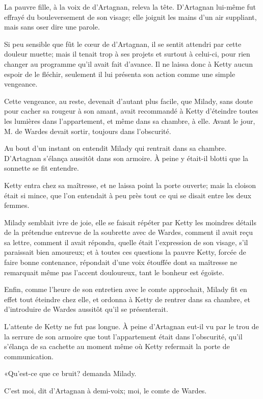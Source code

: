 La pauvre fille, à la voix de d'Artagnan, releva la tête. D'Artagnan lui-même fut effrayé du bouleversement de son visage; elle joignit les mains d'un air suppliant, mais sans oser dire une parole. 

Si peu sensible que fût le cœur de d'Artagnan, il se sentit attendri par cette douleur muette; mais il tenait trop à ses projets et surtout à celui-ci, pour rien changer au programme qu'il avait fait d'avance. Il ne laissa donc à Ketty aucun espoir de le fléchir, seulement il lui présenta son action comme une simple vengeance. 

Cette vengeance, au reste, devenait d'autant plus facile, que Milady, sans doute pour cacher sa rougeur à son amant, avait recommandé à Ketty d'éteindre toutes les lumières dans l'appartement, et même dans sa chambre, à elle. Avant le jour, M. de Wardes devait sortir, toujours dans l'obscurité. 

Au bout d'un instant on entendit Milady qui rentrait dans sa chambre. D'Artagnan s'élança aussitôt dans son armoire. À peine y était-il blotti que la sonnette se fit entendre. 

Ketty entra chez sa maîtresse, et ne laissa point la porte ouverte; mais la cloison était si mince, que l'on entendait à peu près tout ce qui se disait entre les deux femmes. 

Milady semblait ivre de joie, elle se faisait répéter par Ketty les moindres détails de la prétendue entrevue de la soubrette avec de Wardes, comment il avait reçu sa lettre, comment il avait répondu, quelle était l'expression de son visage, s'il paraissait bien amoureux; et à toutes ces questions la pauvre Ketty, forcée de faire bonne contenance, répondait d'une voix étouffée dont sa maîtresse ne remarquait même pas l'accent douloureux, tant le bonheur est égoïste. 

Enfin, comme l'heure de son entretien avec le comte approchait, Milady fit en effet tout éteindre chez elle, et ordonna à Ketty de rentrer dans sa chambre, et d'introduire de Wardes aussitôt qu'il se présenterait. 

L'attente de Ketty ne fut pas longue. À peine d'Artagnan eut-il vu par le trou de la serrure de son armoire que tout l'appartement était dans l'obscurité, qu'il s'élança de sa cachette au moment même où Ketty refermait la porte de communication. 

«Qu'est-ce que ce bruit? demanda Milady. 

\speak  C'est moi, dit d'Artagnan à demi-voix; moi, le comte de Wardes. 

